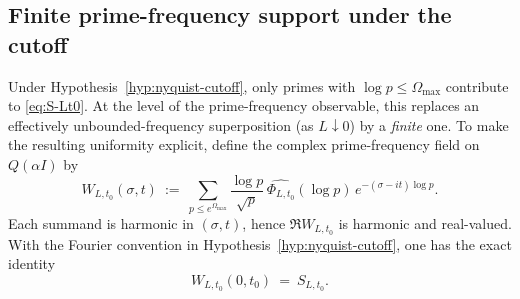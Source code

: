 \documentclass[11pt]{article}
\begin{document}
\subsection*{Finite prime-frequency support under the cutoff}
Under Hypothesis~\ref{hyp:nyquist-cutoff}, only primes with $\log p\le \Omega_{\max}$ contribute to \eqref{eq:S-Lt0}.
At the level of the prime-frequency observable, this replaces an effectively unbounded-frequency superposition (as $L\downarrow 0$) by a \emph{finite} one.
To make the resulting uniformity explicit, define the complex prime-frequency field on $Q(\alpha I)$ by
\begin{equation}\label{eq:prime-field}
  W_{L,t_0}(\sigma,t)\ :=\ \sum_{p\le e^{\Omega_{\max}}}
  \frac{\log p}{\sqrt{p}}\,
  \widehat{\Phi_{L,t_0}}(\log p)\,
  e^{-(\sigma-i t)\log p}.
\end{equation}
Each summand is harmonic in $(\sigma,t)$, hence $\Re W_{L,t_0}$ is harmonic and real-valued.
With the Fourier convention in Hypothesis~\ref{hyp:nyquist-cutoff}, one has the exact identity
\[
  W_{L,t_0}(0,t_0)\ =\ S_{L,t_0}.
\]
\end{document}
